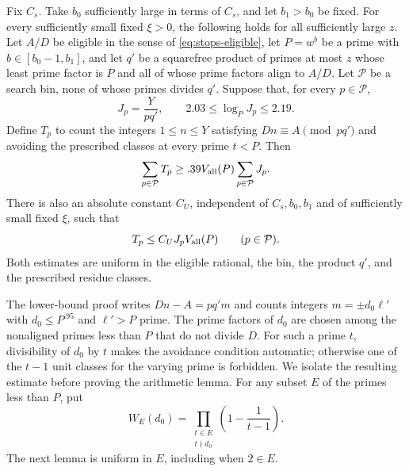 \begin{lemma}
\label{lem:stops-aligned-average}
Fix $C_s$.  Take $b_0$ sufficiently large in terms of $C_s$, and let
$b_1>b_0$ be fixed.  For every sufficiently small fixed $\xi>0$, the
following holds for all sufficiently large $z$.
Let $A/D$ be eligible in the sense of \eqref{eq:stops-eligible}, let
$P=w^b$ be a prime with $b\in[b_0-1,b_1]$, and let $q'$ be a squarefree
product of primes at most $z$ whose least prime factor is $P$ and all of whose prime factors
align to $A/D$.  Let $\mathcal P$ be a search bin, none of whose primes
divides $q'$.  Suppose that, for every $p\in\mathcal P$,
\begin{equation}\label{eq:stops-length-exponents}
 J_p=\frac{Y}{pq'},\qquad 2.03\le\log_PJ_p\le2.19.
\end{equation}
Define $T_p$ to count the integers $1\le n\le Y$ satisfying
$Dn\equiv A\pmod{pq'}$ and avoiding the prescribed classes at every
prime $t<P$.  Then
\begin{equation}\label{eq:stops-all-primes-lower}
 \sum_{p\in\mathcal P}T_p
 \ge .39V_{\rm all}(P)\sum_{p\in\mathcal P}J_p.
\end{equation}
There is also an absolute constant $C_U$, independent of
$C_s,b_0,b_1$ and of sufficiently small fixed $\xi$, such that
\begin{equation}\label{eq:stops-individual-upper}
 T_p\le C_UJ_pV_{\rm all}(P)\qquad(p\in\mathcal P).
\end{equation}
Both estimates are uniform in the eligible rational, the bin, the
product $q'$, and the prescribed residue classes.
\end{lemma}

The lower-bound proof writes $Dn-A=pq'm$ and counts integers
$m=\pm d_0\ell'$ with $d_0\le P^{.95}$ and $\ell'>P$ prime.
The prime factors of $d_0$ are chosen among the nonaligned primes
less than $P$ that do not divide $D$.  For such a prime $t$, divisibility
of $d_0$ by $t$ makes the avoidance condition automatic; otherwise
one of the $t-1$ unit classes for the varying prime is forbidden.
We isolate the resulting estimate before proving the arithmetic lemma.
For any subset $E$ of the primes less than $P$, put
\begin{equation}\label{eq:stops-euler-weight}
 W_E(d_0)=\prod_{\substack{t\in E\\t\nmid d_0}}
                    \left(1-\frac1{t-1}\right).
\end{equation}
The next lemma is uniform in $E$, including when $2\in E$.

